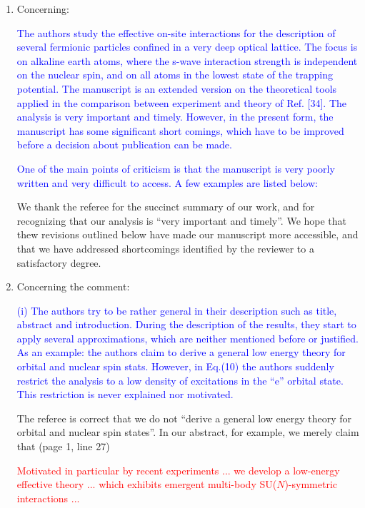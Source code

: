 \documentclass[preprint]{revtex4-1}
\newcommand{\1}{\mathds{1}}
\newcommand{\blue}[1]{\textcolor{blue}{#1}}
\newcommand{\red}[1]{\textcolor{red}{#1}}
\begin{document}
\begin{enumerate}
\item Concerning:

  \blue{The authors study the effective on-site interactions for the
    description of several fermionic particles confined in a very deep
    optical lattice. The focus is on alkaline earth atoms, where the
    s-wave interaction strength is independent on the nuclear spin,
    and on all atoms in the lowest state of the trapping
    potential. The manuscript is an extended version on the
    theoretical tools applied in the comparison between experiment and
    theory of Ref. [34].  The analysis is very important and
    timely. However, in the present form, the manuscript has some
    significant short comings, which have to be improved before a
    decision about publication can be made.}

  \blue{One of the main points of criticism is that the manuscript is
    very poorly written and very difficult to access. A few examples
    are listed below:}

  We thank the referee for the succinct summary of our work, and for
  recognizing that our analysis is ``very important and timely''.  We
  hope that thew revisions outlined below have made our manuscript
  more accessible, and that we have addressed shortcomings identified
  by the reviewer to a satisfactory degree.


\item Concerning the comment:

  \blue{(i) The authors try to be rather general in their description
    such as title, abstract and introduction. During the description
    of the results, they start to apply several approximations, which
    are neither mentioned before or justified.  As an example: the
    authors claim to derive a general low energy theory for orbital
    and nuclear spin stats. However, in Eq.(10) the authors suddenly
    restrict the analysis to a low density of excitations in the ``e''
    orbital state. This restriction is never explained nor motivated.}

  \label{pt:general}

  The referee is correct that we do not ``derive a general low energy
  theory for orbital and nuclear spin states''.  In our abstract, for
  example, we merely claim that (page 1, line 27)

  \red{Motivated in particular by recent experiments ... we develop a
    low-energy effective theory ... which exhibits emergent multi-body
    SU($N$)-symmetric interactions ...}


\end{enumerate}
\end{document}

